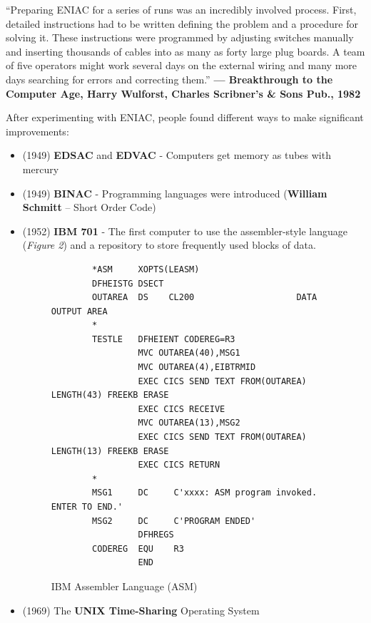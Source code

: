 \documentclass[12pt]{article}
\begin{document}
\begin{center}
    \footnotesize“Preparing ENIAC for a series of runs was an incredibly involved process. First, detailed instructions had to be written defining the problem and a procedure for solving it. These instructions were programmed by adjusting switches manually and inserting thousands of cables into as many as forty large plug boards. A team of five operators might work several days on the external wiring and many more days searching for errors and correcting them.”\textbf{ — Breakthrough to the Computer Age, Harry Wulforst, Charles Scribner’s \& Sons Pub., 1982}
\end{center}

\noindent After experimenting with ENIAC, people found different ways to make significant improvements:
\begin{itemize}
    \item (1949) \textbf{EDSAC} and \textbf{EDVAC} - Computers get memory as tubes with mercury
    \item (1949) \textbf{BINAC} - Programming languages were introduced (\textbf{William Schmitt} – Short Order Code)
    \item (1952) \textbf{IBM 701} - The first computer to use the assembler-style language (\textit{Figure 2}) and a repository to store frequently used blocks of data.
    \begin{figure}[H]
        \centering
        \begin{verbatim}
        *ASM     XOPTS(LEASM)
        DFHEISTG DSECT
        OUTAREA  DS    CL200                    DATA OUTPUT AREA
        *
        TESTLE   DFHEIENT CODEREG=R3
                 MVC OUTAREA(40),MSG1
                 MVC OUTAREA(4),EIBTRMID
                 EXEC CICS SEND TEXT FROM(OUTAREA) LENGTH(43) FREEKB ERASE
                 EXEC CICS RECEIVE
                 MVC OUTAREA(13),MSG2
                 EXEC CICS SEND TEXT FROM(OUTAREA) LENGTH(13) FREEKB ERASE
                 EXEC CICS RETURN
        *
        MSG1     DC     C'xxxx: ASM program invoked. ENTER TO END.'
        MSG2     DC     C'PROGRAM ENDED'
                 DFHREGS
        CODEREG  EQU    R3
                 END
        \end{verbatim}
        \caption{IBM Assembler Language (ASM)}
    \end{figure}
    \item (1969) The \textbf{UNIX Time-Sharing} Operating System
\end{itemize}
\end{document}
